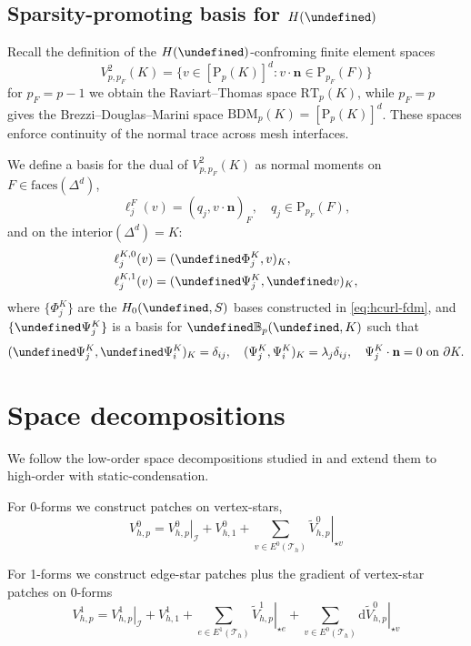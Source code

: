 \documentclass[review,onefignum,onetabnum,a4paper]{siamart190516}
\let\curl\undefined
\let\div\undefined
\DeclareMathOperator{\curl}{curl}
\DeclareMathOperator{\div}{div}
\newcommand{\Hdiv}{H(\div)}
\newcommand{\mesh}{\mathcal{T}_h}
\renewcommand{\vec}[1]{\mathbf{#1}}
\newcommand{\bn}{\vec{n}}
\renewcommand{\P}{\mathrm{P}}
\newcommand{\RT}{\mathrm{RT}}
\newcommand{\BDM}{\mathrm{BDM}}
\begin{document}
\subsection{Sparsity-promoting basis for $\Hdiv$}

Recall the definition of the $\Hdiv$-confroming finite element spaces
\begin{equation}
V^2_{p, p_F}(K) = \{v\in [\P_p(K)]^d : v\cdot\bn \in \P_{p_F}(F) \}
\end{equation}
for $p_F=p-1$ we obtain the Raviart--Thomas space $\RT_p(K)$, while
$p_F=p$ gives the Brezzi--Douglas--Marini space $\BDM_p(K) = [\P_p(K)]^d$. 
These spaces enforce continuity of the normal trace across mesh interfaces.

We define a basis for the dual of $V^2_{p, p_F}(K)$ as normal moments on $F\in
\text{faces}(\Delta^d)$,
\begin{equation}
   \ell^F_j(v) = (q_j, v\cdot \bn)_F, \quad q_j \in \P_{p_F}(F),
\end{equation}
and on the $\text{interior}(\Delta^d) = K$: 
\begin{align}
   \ell^{K,0}_j(v) &= (\curl\Phi^K_j, v)_{K}, \\
   \ell^{K,1}_j(v) &= (\div\Psi^K_j, \div v)_{K},
\end{align}
where $\{\Phi^K_j\}$ are the $H_0(\curl, S)$ bases constructed in
\eqref{eq:hcurl-fdm}, and $\{\div\Psi^K_j\}$ is a basis for $\div
\mathbb{B}_p(\div, K)$ such that
\begin{equation} \label{eq:hdiv-fdm}
   (\div\Psi^K_j, \div\Psi^K_i)_K = \delta_{ij}, \quad
   (\Psi^K_j, \Psi^K_i)_{K} = \lambda_j\delta_{ij}, \quad
   \Psi^K_j\cdot\bn = 0 \text{ on }\partial K.
\end{equation}


\section{Space decompositions}


We follow 
the low-order space decompositions studied in \cite{arnold00}
and extend them to high-order with static-condensation.

For 0-forms we construct patches on vertex-stars,
\begin{equation}
   V^0_{h,p} = \left.V^0_{h,p}\right|_\mathcal{I} + V^0_{h,1} 
   + \sum_{v\in E^0(\mesh)} \left.\tilde{V}^0_{h,p}\right|_{\star v} 
\end{equation}

For 1-forms we construct edge-star patches
plus the gradient of vertex-star patches on 0-forms
\begin{equation}
   V^1_{h,p} = \left.V^1_{h,p}\right|_\mathcal{I} +  V^1_{h,1}
   + \sum_{e\in E^1(\mesh)} \left.\tilde{V}^1_{h,p}\right|_{\star e} 
   + \sum_{v\in E^0(\mesh)} \mathrm{d} \left.\tilde{V}^0_{h,p}\right|_{\star v} 
\end{equation}
\end{document}
